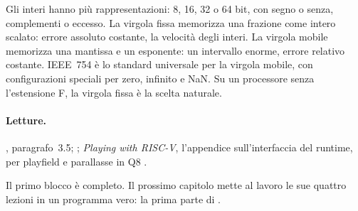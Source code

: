 Gli interi hanno più rappresentazioni: 8, 16, 32 o 64 bit, con segno o senza,
complementi o eccesso. La virgola fissa memorizza una frazione come intero
scalato: errore assoluto costante, la velocità degli interi. La virgola mobile
memorizza una mantissa e un esponente: un intervallo enorme, errore relativo
costante. IEEE~754 è lo standard universale per la virgola mobile, con
configurazioni speciali per zero, infinito e NaN. Su un processore senza
l'estensione F, la virgola fissa è la scelta naturale.

\paragraph{Letture.} \citet{patterson2020}, paragrafo~3.5;
\citet{goldberg1991}; \emph{Playing with RISC-V}, l'appendice sull'interfaccia
del runtime, per playfield e parallasse in Q8 \citep{prg32textbook}.

Il primo blocco è completo. Il prossimo capitolo mette al lavoro le sue quattro
lezioni in un programma vero: la prima parte di \vermone.